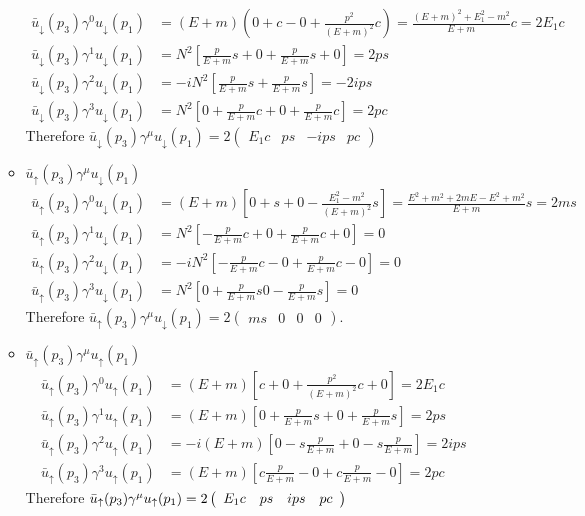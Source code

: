 \begin{enumerate}[label=\alph*)]
\begin{itemize}
\begin{align}
		\bar{u}_{\downarrow}(p_{3})\gamma^{0}u_{\downarrow}(p_{1}) &= (E+m)(0+ c -0+ \tfrac{p^{2}}{(E+m)^{2}}c) = \tfrac{(E+m)^{2} +E_{1}^{2}-m^{2}}{E+m}c = 2E_{1}c\\
		\bar{u}_{\downarrow}(p_{3})\gamma^{1}u_{\downarrow}(p_{1}) &=N^{2}[ \tfrac{p}{E+m}s + 0 +\tfrac{p}{E+m}s+0] =2ps \\
		\bar{u}_{\downarrow}(p_{3})\gamma^{2}u_{\downarrow}(p_{1}) &=-iN^{2}[\tfrac{p}{E+m}s+\tfrac{p}{E+m}s  ] =-2ips\\
		\bar{u}_{\downarrow}(p_{3})\gamma^{3}u_{\downarrow}(p_{1}) &=N^{2}[0+ \tfrac{p}{E+m}c+0+\tfrac{p}{E+m}c ] =2pc
		\end{align}
		Therefore \(\bar{u}_{\downarrow}(p_{3})\gamma^{\mu}u_{\downarrow}(p_{1}) = 2\left(\begin{array}{cccc}E_{1}c & ps & -ips & pc\end{array}\right) \)
		\item \(\bar{u}_{\uparrow}(p_{3})\gamma^{\mu}u_{\downarrow}(p_{1})\)
		\begin{align}
		\bar{u}_{\uparrow}(p_{3})\gamma^{0}u_{\downarrow}(p_{1}) &= (E+m)[0 + s + 0 -\tfrac{E_{1}^{2}-m^{2}}{(E+m)^{2}}s] = \tfrac{E^{2}+m^{2}+2mE-E^{2}+m^{2}}{E+m}s=2ms\\
		\bar{u}_{\uparrow}(p_{3})\gamma^{1}u_{\downarrow}(p_{1}) &= N^{2}[-\tfrac{p}{E+m}c+0+\tfrac{p}{E+m}c+0]=0\\
		\bar{u}_{\uparrow}(p_{3})\gamma^{2}u_{\downarrow}(p_{1}) &= -iN^{2}[-\tfrac{p}{E+m}c -0+\tfrac{p}{E+m}c-0]=0\\
		\bar{u}_{\uparrow}(p_{3})\gamma^{3}u_{\downarrow}(p_{1}) &= N^{2}[0+\tfrac{p}{E+m}s 0-\tfrac{p}{E+m}s]=0
		\end{align}
		Therefore \(\bar{u}_{\uparrow}(p_{3})\gamma^{\mu}u_{\downarrow}(p_{1})=2\left(\begin{array}{cccc}ms & 0 & 0 & 0\end{array}\right)\).
		\item \(\bar{u}_{\uparrow}(p_{3})\gamma^{\mu}u_{\uparrow}(p_{1})\)
		\begin{align}
		\bar{u}_{\uparrow}(p_{3})\gamma^{0}u_{\uparrow}(p_{1}) &= (E+m)\left[c + 0 +\tfrac{p^{2}}{(E+m)^{2}}c+0\right]=2E_{1}c \\
		\bar{u}_{\uparrow}(p_{3})\gamma^{1}u_{\uparrow}(p_{1}) &= (E+m)\left[0+\tfrac{p}{E+m}s+0+\tfrac{p}{E+m}s\right]=2ps\\
		\bar{u}_{\uparrow}(p_{3})\gamma^{2}u_{\uparrow}(p_{1}) &= -i(E+m)\left[ 0-s\tfrac{p}{E+m}+0-s\tfrac{p}{E+m} \right] = 2ips\\
		\bar{u}_{\uparrow}(p_{3})\gamma^{3}u_{\uparrow}(p_{1}) &= (E+m)\left[c\tfrac{p}{E+m}-0+c\tfrac{p}{E+m}-0\right] = 2pc
		\end{align}
		Therefore \(\bar{u}_{\uparrow}(p_{3})\gamma^{\mu}u_{\uparrow}(p_{1})= 2\left(\begin{array}{cccc}E_{1}c & ps & ips & pc\end{array}\right)\\\)
		

\end{itemize}
\end{enumerate}
